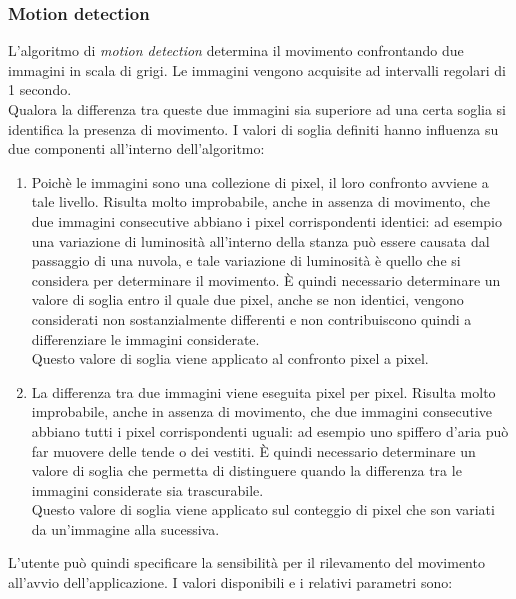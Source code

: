 \subsubsection{Motion detection}
L'algoritmo di \textit{motion detection} determina il movimento confrontando due immagini in scala di grigi. Le immagini vengono acquisite ad intervalli regolari di 1 secondo.\\
Qualora la differenza tra queste due immagini sia superiore ad una certa soglia si identifica la presenza di movimento. I valori di soglia definiti hanno influenza su due componenti all'interno dell'algoritmo:
\begin{enumerate}
  \item Poichè le immagini sono una collezione di pixel, il loro confronto avviene a tale livello. Risulta molto improbabile, anche in assenza di movimento, che due immagini consecutive abbiano i pixel corrispondenti identici: ad esempio una variazione di luminosità all'interno della stanza può essere causata dal passaggio di una nuvola, e tale variazione di luminosità è quello che si considera per determinare il movimento. \`E quindi necessario determinare un valore di soglia entro il quale due pixel, anche se non identici, vengono considerati non sostanzialmente differenti e non contribuiscono quindi a differenziare le immagini considerate.\\
  Questo valore di soglia viene applicato al confronto pixel a pixel.
  \item La differenza tra due immagini viene eseguita pixel per pixel. Risulta molto improbabile, anche in assenza di movimento, che due immagini consecutive abbiano tutti i pixel corrispondenti uguali: ad esempio uno spiffero d'aria può far muovere delle tende o dei vestiti. \`E quindi necessario determinare un valore di soglia che permetta di distinguere quando la differenza tra le immagini considerate sia trascurabile.\\
  Questo valore di soglia viene applicato sul conteggio di pixel che son variati da un'immagine alla sucessiva.
\end{enumerate}
L'utente può quindi specificare la sensibilità per il rilevamento del movimento all'avvio dell'applicazione. I valori disponibili e i relativi parametri sono:
